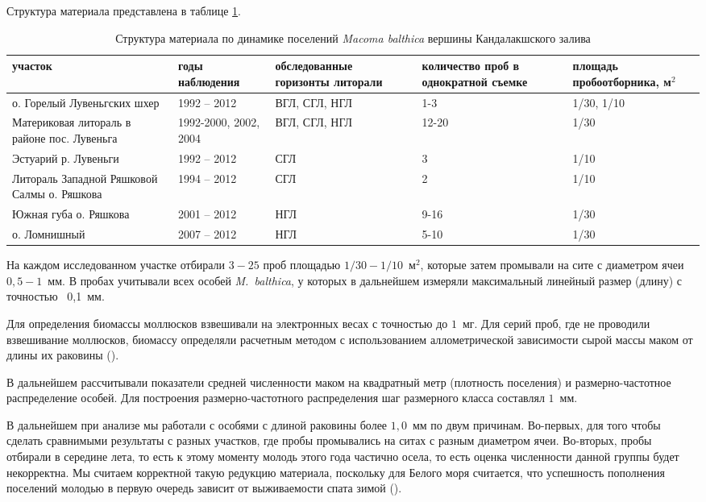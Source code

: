 Структура материала представлена в таблице \ref{tab:material_Kandalaksha}.
\begin{table}[p]
\caption{Структура материала по динамике поселений {\it Macoma balthica} вершины Кандалакшского залива}
\label{tab:material_Kandalaksha}
    \begin{tabularx}{\textwidth}{|*{5}{X|}} \hline
участок & годы наблюдения & обследованные горизонты литорали & количество проб в однократной съемке & площадь пробоотборника, м$^2$  \\ \hline
о. Горелый Лувеньгских шхер & 1992 -- 2012 & ВГЛ, СГЛ, НГЛ & 1-3 & 1/30, 1/10 \\ \hline
Материковая литораль в районе пос. Лувеньга & 1992-2000, 2002, 2004 & ВГЛ, СГЛ, НГЛ & 12-20 & 1/30 \\ \hline
Эстуарий р. Лувеньги & 1992 -- 2012 & СГЛ & 3 & 1/10 \\ \hline
Литораль Западной Ряшковой Салмы о. Ряшкова & 1994 -- 2012 & СГЛ & 2 & 1/10 \\ \hline
Южная губа о. Ряшкова & 2001 -- 2012 & НГЛ & 9-16 & 1/30 \\ \hline
о. Ломнишный & 2007 -- 2012 & НГЛ & 5-10 & 1/30  \\ \hline
\end{tabularx}
\end{table}

На каждом исследованном участке отбирали $3 - 25$ проб площадью $1/30 - 1/10$~м$^2$, которые затем промывали на сите с диаметром ячеи $0,5 - 1$~мм. 
В пробах учитывали всех особей {\it M.~balthica}, у которых в дальнейшем измеряли максимальный линейный размер (длину) с точностью ~0,1~мм. 

Для определения биомассы моллюсков взвешивали на электронных весах с точностью до $1$~мг. 
Для серий проб, где не проводили взвешивание моллюсков, биомассу определяли расчетным методом с использованием аллометрической зависимости сырой массы маком от длины их раковины (\cite{Maximovich_et_al_1993}). 

В дальнейшем рассчитывали показатели средней численности маком на квадратный метр (плотность поселения) и размерно-частотное распределение особей.
Для построения размерно-частотного распределения шаг размерного класса составлял $1$~мм.

В дальнейшем при анализе мы работали с особями с длиной раковины более $1,0$~мм по двум причинам. 
Во-первых, для того чтобы сделать сравнимыми результаты с разных участков, где пробы промывались на ситах с разным диаметром ячеи. 
Во-вторых, пробы отбирали в середине лета, то есть к этому моменту молодь этого года частично осела, то есть оценка численности данной группы будет некорректна.
Мы считаем корректной такую редукцию материала, поскольку для Белого моря считается, что успешность пополнения поселений молодью в первую очередь зависит от выживаемости спата зимой (\cite{Maximovich_Gerasimova_2004}).


